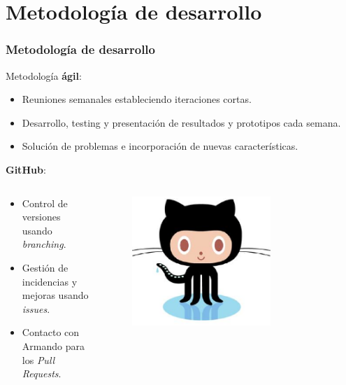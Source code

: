 \documentclass{beamer}
\begin{document}

\section{Metodología de desarrollo}
\begin{frame}
  \frametitle{Metodología de desarrollo}
  
  Metodología {\bfseries ágil}:
  \begin{itemize}
    \item Reuniones semanales estableciendo iteraciones cortas.
    \item Desarrollo, testing y presentación de resultados y prototipos cada semana.
    \item Solución de problemas e incorporación de nuevas características. 
  \end{itemize}
  \bigskip
  
  {\bfseries GitHub}:
  \begin{columns}
    \begin{column}{9cm}
      \begin{itemize}
        \item Control de versiones usando \textit{branching}.
        \item Gestión de incidencias y mejoras usando \textit{issues}.
        \item Contacto con Armando para los \textit{Pull Requests}.
      \end{itemize}
    \end{column}
    \begin{column}{4cm}
      \begin{figure}
        \includegraphics[width=0.7\textwidth]{img/octocat.eps}
      \end{figure}
    \end{column}
  \end{columns}
\end{frame}
\end{document}
